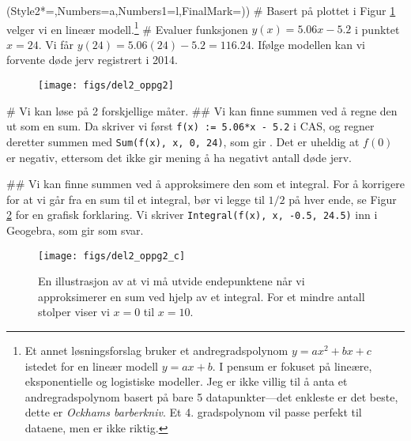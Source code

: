 \begin{easylist}[enumerate]
\ListProperties(Style2*=,Numbers=a,Numbers1=l,FinalMark={)})
# Basert på plottet i Figur \ref{fig:del2_oppg2} velger vi en lineær modell.\footnote{Et annet løsningsforslag bruker et andregradspolynom $y=ax^2 + bx + c$
	istedet for en lineær modell $y=ax + b$.
	I pensum er fokuset på lineære, eksponentielle og logistiske modeller. 
	Jeg er ikke villig til å anta et andregradspolynom basert på bare 5 datapunkter---det enkleste er det beste, dette er \emph{Ockhams barberkniv}. Et 4. gradspolynom vil passe perfekt til dataene, men er ikke riktig.}
# Evaluer funksjonen $y(x) = 5.06x - 5.2$ i punktet
$x = 24$. Vi får $y(24) = 5.06(24) - 5.2 = 116.24$.
Ifølge modellen kan vi forvente  døde jerv registrert i 2014.

\begin{figure}[ht!]
	\centering
	\texttt{[image: figs/del2\_oppg2]}
	\caption{}
	\label{fig:del2_oppg2}
\end{figure}


# Vi kan løse på 2 forskjellige måter.
## Vi kan finne summen ved å regne den ut som en sum.
Da skriver vi først \verb|f(x) := 5.06*x - 5.2| i CAS,
og regner deretter summen med \verb|Sum(f(x), x, 0, 24)|, som gir . Det er uheldig at $f(0)$ er negativ, ettersom
det ikke gir mening å ha negativt antall døde jerv.

## Vi kan finne summen ved å approksimere den som et integral.
For å korrigere for at vi går fra en sum til et integral,
bør vi legge til $1/2$ på hver ende, se Figur \ref{fig:del2_oppg2_c}
for en grafisk forklaring.
Vi skriver \verb|Integral(f(x), x, -0.5, 24.5)| inn i Geogebra, som gir  som svar.

\begin{figure}[ht!]
\centering
\texttt{[image: figs/del2\_oppg2\_c]}
\caption{En illustrasjon av at vi må utvide endepunktene når vi approksimerer en sum ved hjelp av et integral. For et mindre antall stolper viser vi $x=0$ til $x=10$.}
\label{fig:del2_oppg2_c}
\end{figure}
\end{easylist}


